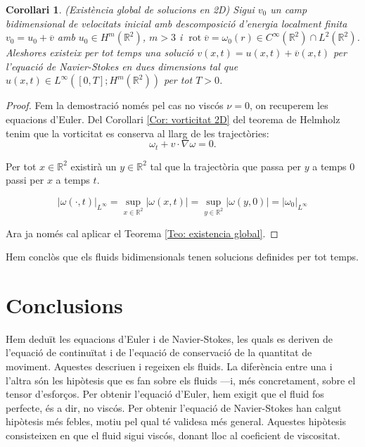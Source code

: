 \documentclass{article}
\numberwithin{equation}{section}
\DeclareMathOperator{\rot}{rot}
\newtheorem{corollari}{Corol\textperiodcentered lari}[section]
\begin{document}
\begin{corollari}
(Exist\`{e}ncia global de solucions en 2D) Sigui $v_0$ un camp bidimensional de velocitats inicial amb descomposici\'{o} d'energia localment finita $v_0=u_0+\overline v$ amb $u_0\in H^m(\mathbb{R}^2)$, $m>3$ i $\rot\overline v=\omega_0(r)\in C^{\infty}(\mathbb{R}^2)\cap L^2(\mathbb{R}^2)$. Aleshores existeix per tot temps una soluci\'{o} $v(x,t)=u(x,t)+\overline v(x,t)$ per l'equaci\'{o} de Navier-Stokes en dues dimensions tal que $u(x,t)\in L^{\infty}([0,T];H^m(\mathbb{R}^2))$ per tot $T>0$.
\end{corollari}
\begin{proof}
Fem la demostraci\'{o} nom\'{e}s pel cas no visc\'{o}s $\nu=0$, on recuperem les equacions d'Euler. Del Corol\textperiodcentered lari \ref{Cor: vorticitat 2D} del teorema de Helmholz tenim que la vorticitat es conserva al llarg de les traject\`{o}ries:
\[\omega_t+v\cdot\nabla\omega=0.\]

Per tot $x\in\mathbb{R}^2$ existir\`{a} un $y\in\mathbb{R}^2$ tal que la traject\`{o}ria que passa per $y$ a temps $0$ passi per $x$ a temps $t$.

\[|\omega(\cdot,t)|_{L^{\infty}}=\sup_{x\in\mathbb{R}^2}|\omega(x,t)|=\sup_{y\in\mathbb{R}^2}|\omega(y,0)|=|\omega_0|_{L^{\infty}}\]

Ara ja nom\'{e}s cal aplicar el Teorema \ref{Teo: existencia global}.
\end{proof}

Hem concl\`{o}s que els fluids bidimensionals tenen solucions definides per tot temps.

\section{Conclusions}

Hem dedu\"{i}t les equacions d'Euler i de Navier-Stokes, les quals es deriven de l'equaci\'{o} de continu\"{i}tat i de l'equaci\'{o} de conservaci\'{o} de la quantitat de moviment. Aquestes descriuen i regeixen els fluids. La difer\`{e}ncia entre una i l'altra s\'{o}n les hip\`{o}tesis que es fan sobre els fluids ---i, m\'{e}s concretament, sobre el tensor d'esfor\c{c}os. Per obtenir l'equaci\'{o} d'Euler, hem exigit que el fluid fos perfecte, \'{e}s a dir, no visc\'{o}s. Per obtenir l'equaci\'{o} de Navier-Stokes han calgut hip\`{o}tesis m\'{e}s febles, motiu pel qual t\'{e} validesa m\'{e}s general. Aquestes hip\`{o}tesis consisteixen en que el fluid sigui visc\'{o}s, donant lloc al coeficient de viscositat.
\end{document}
